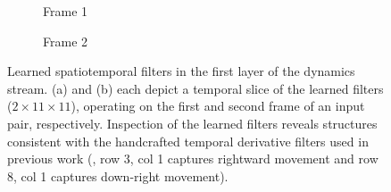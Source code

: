 \begin{figure}
	\centering
	\begin{subfigure}[b]{0.25\textwidth}
		\vspace{-0.45cm}
		\caption{Frame 1}
	\end{subfigure}\hspace{5mm}%
	\begin{subfigure}[b]{0.25\textwidth}
		\vspace{-0.45cm}
		\caption{Frame 2}
	\end{subfigure}
	\caption[Learned spatiotemporal filters in the first layer of the dynamics stream]{Learned spatiotemporal filters in the first layer of the dynamics stream. (a) and (b) each depict a temporal slice of the learned filters ($2 \times 11 \times 11$), operating on the first and second frame of an input pair, respectively. Inspection of the learned filters reveals structures consistent with the handcrafted temporal derivative filters used in previous work \cite{derpanis2012spacetime} (\eg, row 3, col 1 captures rightward movement and row 8, col 1 captures down-right movement).}
	\label{fig:filters}
\end{figure}
